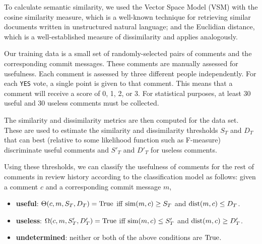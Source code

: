 To calculate semantic similarity, we used the Vector Space Model (VSM) with the cosine similarity measure, which is a well-known technique for retrieving similar documents written in unstructured natural language; and the Euclidian distance, which is a well-established measure of dissimilarity and applies analogously.

Our training data is a small set of randomly-selected pairs of comments and the corresponding commit messages.
These comments are manually assessed for usefulness.
Each comment is assessed by three different people independently.
For each \texttt{YES} vote, a single point is given to that comment.
This means that a comment will receive a score of 0, 1, 2, or 3.
For statistical purposes, at least 30 useful and 30 useless comments must be collected.

The similarity and dissimilarity metrics are then computed for the data set.
These are used to estimate the similarity and dissimilarity thresholds $S_T$ and $D_T$ that can best (relative to some likelihood function such as F-measure) discriminate useful comments and $S'_T$ and $D'_T$ for useless comments.

Using these thresholds, we can classify the usefulness of comments for the rest of comments in review history according to the classification model as follows: given a comment $c$ and a corresponding commit message $m$,
\begin{itemize}
\item \textbf{useful}: $\Theta(c,m,S_T,D_T) = \operatorname{True}$ iff $\operatorname{sim}(m,c) \geq S_T$ and $\operatorname{dist}(m,c) \leq D_T$.
\item \textbf{useless}: $\Omega(c,m,S'_T,D'_T) = \operatorname{True}$ iff $\operatorname{sim}(m,c) \leq  S'_T$ and $\operatorname{dist}(m,c) \geq D'_T$.
\item \textbf{undetermined}: neither or both of the above conditions are $\operatorname{True}$.
\end{itemize}

